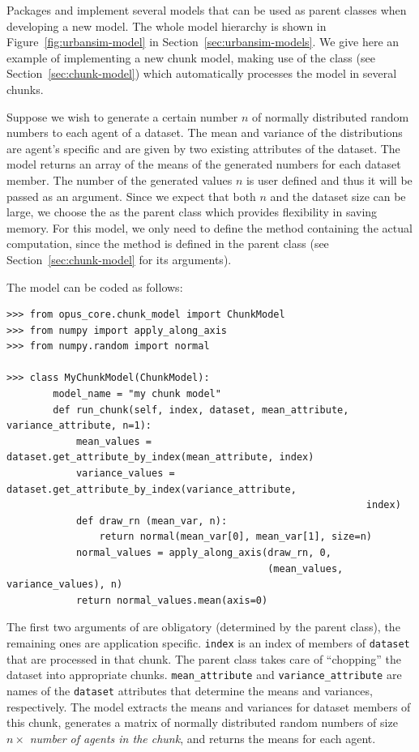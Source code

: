 Packages  and  implement several models that can be used
as parent classes when developing a new model. The whole model hierarchy is shown in
Figure~\ref{fig:urbansim-model} in Section~\ref{sec:urbansim-models}.
We give here an example of implementing a new chunk model, making use of the 
class  (see Section~\ref{sec:chunk-model}) which automatically
processes the model in several chunks.

Suppose we wish to generate a certain number $n$ of normally distributed random numbers
to each agent of a dataset. The mean and variance of the distributions are agent's specific and are
given by two existing attributes of the dataset. 
The model returns an array of the means of the generated numbers
for each dataset member. The number of the generated values $n$ is user defined and thus it will be
passed as an argument. Since we expect that both $n$ and the dataset size can be large, we choose
the  as the parent class which provides flexibility in saving memory. For this model,
we only need to define the method  containing the actual computation,
since the  method is defined
in the parent class (see Section~\ref{sec:chunk-model} for its arguments).

The model can be coded as follows:

\begin{verbatim}
>>> from opus_core.chunk_model import ChunkModel
>>> from numpy import apply_along_axis
>>> from numpy.random import normal

>>> class MyChunkModel(ChunkModel):
        model_name = "my chunk model"
        def run_chunk(self, index, dataset, mean_attribute, variance_attribute, n=1):
            mean_values = dataset.get_attribute_by_index(mean_attribute, index)
            variance_values = dataset.get_attribute_by_index(variance_attribute, 
                                                              index)
            def draw_rn (mean_var, n):
                return normal(mean_var[0], mean_var[1], size=n)
            normal_values = apply_along_axis(draw_rn, 0, 
                                             (mean_values, variance_values), n)
            return normal_values.mean(axis=0)
\end{verbatim}
The first two arguments of  are obligatory (determined by the parent class),
the remaining ones are application specific. \verb|index| is an index of members of \verb|dataset|
that are processed in that chunk. The parent class takes care of ``chopping'' the dataset 
into appropriate chunks. \verb|mean_attribute| and \verb|variance_attribute| are names of the
\verb|dataset| attributes that determine the means and variances, respectively. The model extracts
the means and variances for dataset members of this chunk, generates a matrix of normally distributed
random numbers of size $n \times$ {\em number of agents in the chunk}, and returns the means for each agent.


